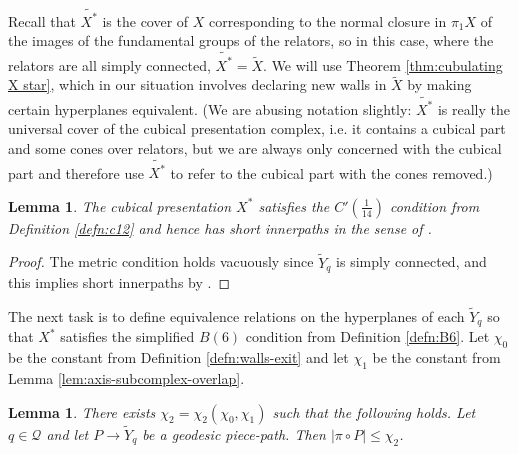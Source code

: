 \documentclass[11pt,oneside]{amsart}
\newcounter{ax}
\newtheorem{lem}[thm]{Lemma}
\theoremstyle{definition}
\begin{document}
Recall that $\widetilde{X^*}$ is the cover of $X$ corresponding to the normal closure in $\pi_1X$ of the images of the fundamental groups of the relators, so in this case, where the relators are all simply connected, $\widetilde{X^*}=\widetilde X$. We will use Theorem \ref{thm:cubulating X star}, which in our situation involves declaring new walls in $\widetilde X$ by making certain hyperplanes equivalent.  (We are abusing notation slightly: $\widetilde{X^*}$ is really the universal cover of the cubical presentation complex, i.e. it contains a cubical part and some cones over relators, but we are always only concerned with the cubical part and therefore use $\widetilde{X^*}$ to refer to the cubical part with the cones removed.)

\begin{lem}\label{lem:metric-small-cancellation}
The cubical presentation $X^*$ satisfies the $C'(\frac{1}{14})$ condition from Definition \ref{defn:c12} and hence has short innerpaths in the sense of \cite[Defn. 3.69]{Wise:QCH}
.
\end{lem}

\begin{proof}
The metric condition holds vacuously since $\widetilde Y_q$ is simply connected, and this implies short innerpaths by \cite[Lem. 3.70]{Wise:QCH}.
\end{proof}

The next task is to define equivalence relations on the hyperplanes of each $\widetilde Y_q$ so that $X^*$ satisfies the simplified $B(6)$ condition from Definition \ref{defn:B6}.  Let $\chi_0$ be the constant from Definition \ref{defn:walls-exit} and let $\chi_1$ be the constant from Lemma \ref{lem:axis-subcomplex-overlap}.  

\begin{lem}\label{lem:piece-tree-bound}
There exists $\chi_2=\chi_2(\chi_0,\chi_1)$ such that the following holds.  Let $q\in\mathcal Q$ and let $P\to \widetilde Y_q$ be a geodesic piece-path.  Then $|\pi\circ P|\leq \chi_2$.
\end{lem}
\end{document}
